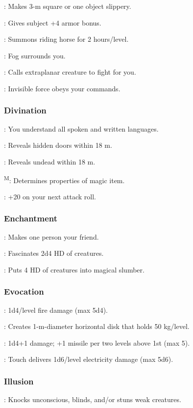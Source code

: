 	: Makes 3-m square or one object slippery.

	: Gives subject +4 armor bonus.

	: Summons riding horse for 2 hours/level.

	: Fog surrounds you.

	: Calls extraplanar creature to fight for you.

	: Invisible force obeys your commands.

\subsubsection{Divination}
	: You understand all spoken and written languages.

	: Reveals hidden doors within 18 m.

	: Reveals undead within 18 m.

	\textsuperscript{M}: Determines properties of magic item.

	: +20 on your next attack roll.

\subsubsection{Enchantment}
	: Makes one person your friend.

	: Fascinates 2d4 HD of creatures.

	: Puts 4 HD of creatures into magical slumber.

\subsubsection{Evocation}
	: 1d4/level fire damage (max 5d4).

	: Creates 1-m-diameter horizontal disk that holds 50 kg/level.

	: 1d4+1 damage; +1 missile per two levels above 1st (max 5).

	: Touch delivers 1d6/level electricity damage (max 5d6).

\subsubsection{Illusion}
	: Knocks unconscious, blinds, and/or stuns weak creatures.


